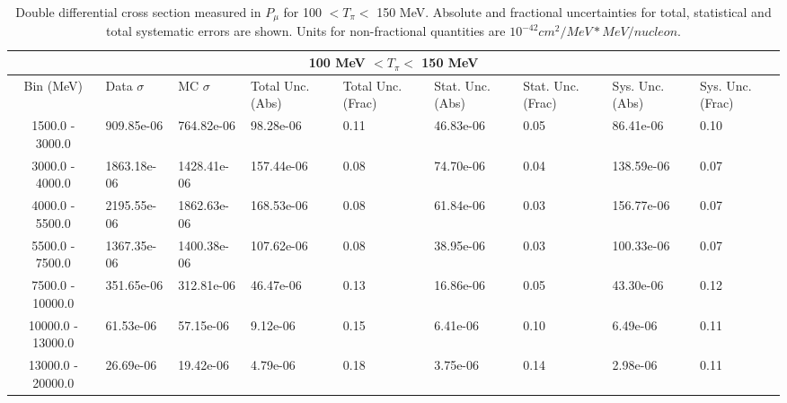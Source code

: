 \begin{table}[!htb]
    \centering
    \tiny
    \begin{tabular}{|c|p{0.5in}|p{0.5in}|p{0.5in}|p{0.5in}|p{0.5in}|p{0.5in}|p{0.5in}|p{0.5in}|}

        \hline
        \multicolumn{9}{c}{100 MeV $ < T_\pi < $ 150 MeV}\\
        \hline
        Bin (MeV)& Data $\sigma$ & MC $\sigma$ & Total Unc. (Abs) & Total Unc. (Frac)  & Stat. Unc. (Abs) & Stat. Unc. (Frac) & Sys. Unc. (Abs) & Sys. Unc. (Frac)\\ \hline

1500.0 - 3000.0 & 909.85e-06 & 764.82e-06 & 98.28e-06 & 0.11 & 46.83e-06 & 0.05 & 86.41e-06 & 0.10\\ \hline
3000.0 - 4000.0 & 1863.18e-06 & 1428.41e-06 & 157.44e-06 & 0.08 & 74.70e-06 & 0.04 & 138.59e-06 & 0.07\\ \hline
4000.0 - 5500.0 & 2195.55e-06 & 1862.63e-06 & 168.53e-06 & 0.08 & 61.84e-06 & 0.03 & 156.77e-06 & 0.07\\ \hline
5500.0 - 7500.0 & 1367.35e-06 & 1400.38e-06 & 107.62e-06 & 0.08 & 38.95e-06 & 0.03 & 100.33e-06 & 0.07\\ \hline
7500.0 - 10000.0 & 351.65e-06 & 312.81e-06 & 46.47e-06 & 0.13 & 16.86e-06 & 0.05 & 43.30e-06 & 0.12\\ \hline
10000.0 - 13000.0 & 61.53e-06 & 57.15e-06 & 9.12e-06 & 0.15 & 6.41e-06 & 0.10 & 6.49e-06 & 0.11\\ \hline
13000.0 - 20000.0 & 26.69e-06 & 19.42e-06 & 4.79e-06 & 0.18 & 3.75e-06 & 0.14 & 2.98e-06 & 0.11\\ \hline

    \end{tabular}
    \caption{Double differential cross section measured in $P_\mu$ for 100 $ < T_\pi < $ 150 MeV. Absolute and fractional uncertainties for total, statistical and total systematic errors are shown. Units for non-fractional quantities are $10^{-42}cm^2/MeV*MeV/nucleon$.}
    \label{tab:ApdxA:XSecTable2Dpmutpi2}
\end{table}


